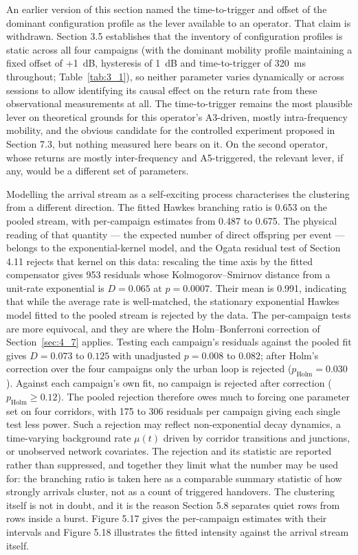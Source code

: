 An earlier version of this section named the time-to-trigger and offset of the dominant configuration profile as the lever available to an operator. That claim is withdrawn. Section 3.5 establishes that the inventory of configuration profiles is static across all four campaigns (with the dominant mobility profile maintaining a fixed offset of +1~dB, hysteresis of 1~dB and time-to-trigger of 320~ms throughout; Table~\ref{tab:3_1}), so neither parameter varies dynamically or across sessions to allow identifying its causal effect on the return rate from these observational measurements at all. The time-to-trigger remains the most plausible lever on theoretical grounds for this operator's A3-driven, mostly intra-frequency mobility, and the obvious candidate for the controlled experiment proposed in Section 7.3, but nothing measured here bears on it. On the second operator, whose returns are mostly inter-frequency and A5-triggered, the relevant lever, if any, would be a different set of parameters.

Modelling the arrival stream as a self-exciting process characterises the clustering from a different direction. The fitted Hawkes branching ratio is 0.653 on the pooled stream, with per-campaign estimates from 0.487 to 0.675. The physical reading of that quantity --- the expected number of direct offspring per event --- belongs to the exponential-kernel model, and the Ogata residual test of Section 4.11 rejects that kernel on this data: rescaling the time axis by the fitted compensator gives 953 residuals whose Kolmogorov--Smirnov distance from a unit-rate exponential is $D = 0.065$ at $p = 0.0007$. Their mean is 0.991, indicating that while the average rate is well-matched, the stationary exponential Hawkes model fitted to the pooled stream is rejected by the data. The per-campaign tests are more equivocal, and they are where the Holm--Bonferroni correction of Section~\ref{sec:4_7} applies. Testing each campaign's residuals against the pooled fit gives $D = 0.073$ to $0.125$ with unadjusted $p = 0.008$ to $0.082$; after Holm's correction over the four campaigns only the urban loop is rejected ($p_{\text{Holm}} = 0.030$). Against each campaign's own fit, no campaign is rejected after correction ($p_{\text{Holm}} \ge 0.12$). The pooled rejection therefore owes much to forcing one parameter set on four corridors, with 175 to 306 residuals per campaign giving each single test less power. Such a rejection may reflect non-exponential decay dynamics, a time-varying background rate $\mu(t)$ driven by corridor transitions and junctions, or unobserved network covariates. The rejection and its statistic are reported rather than suppressed, and together they limit what the number may be used for: the branching ratio is taken here as a comparable summary statistic of how strongly arrivals cluster, not as a count of triggered handovers. The clustering itself is not in doubt, and it is the reason Section 5.8 separates quiet rows from rows inside a burst. Figure 5.17 gives the per-campaign estimates with their intervals and Figure 5.18 illustrates the fitted intensity against the arrival stream itself.



